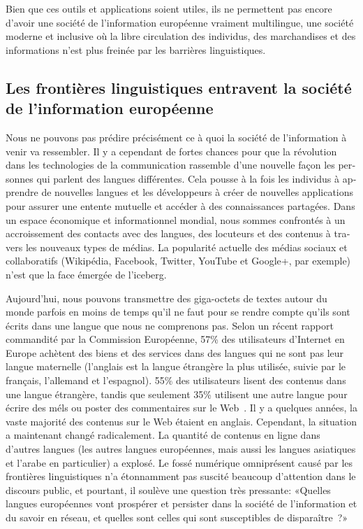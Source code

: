 \begin{french}
\begin{multicols}{2}
Bien que ces outils et applications soient utiles, ils ne permettent
pas encore d'avoir une société de l'information européenne
vraiment multilingue, une société moderne et inclusive où la libre
circulation des individus, des marchandises et des informations n'est
plus freinée par les barrières linguistiques.

\subsection{Les frontières linguistiques entravent la société de l'information européenne}

Nous ne pouvons pas prédire précisément ce à quoi la société de
l'information à venir va ressembler. Il y a cependant de
fortes chances pour que la révolution dans les technologies de la
communication rassemble d'une nouvelle façon les personnes qui
parlent des langues différentes. Cela pousse à la fois les individus à
apprendre de nouvelles langues et les développeurs à créer de
nouvelles applications pour assurer une entente mutuelle et accéder à
des connaissances partagées.
Dans un espace économique et informationnel mondial, nous sommes
confrontés à un accroissement des contacts avec des langues, des
locuteurs et des contenus à travers les nouveaux types de médias. La
popularité actuelle des médias sociaux et collaboratifs (Wikipédia,
Facebook, Twitter, YouTube et Google+, par exemple) n'est que
la face émergée de l'iceberg.

Aujourd'hui, nous pouvons transmettre des giga-octets de textes
autour du monde parfois en moins de temps qu'il ne faut pour se rendre
compte qu'ils sont écrits dans une langue que nous ne comprenons pas.
Selon un récent rapport commandité par la Commission Européenne, 57\%
des utilisateurs d'Internet en Europe achètent des biens et
des services dans des langues qui ne sont pas leur langue maternelle
(l'anglais est la langue étrangère la plus utilisée, suivie
par le français, l'allemand et l'espagnol). 55\% des
utilisateurs lisent des contenus dans une langue étrangère, tandis que
seulement 35\% utilisent une autre langue pour écrire des méls ou
poster des commentaires sur le Web~\cite{Eurobarometer313}. 
Il y a quelques années, la vaste majorité des contenus sur le Web étaient en
anglais. Cependant, la situation a maintenant changé radicalement. La
quantité de contenus en ligne dans d'autres langues (les
autres langues européennes, mais aussi les langues asiatiques et
l'arabe en particulier) a explosé.
Le fossé numérique omniprésent causé par les frontières linguistiques
n'a étonnamment pas suscité beaucoup d'attention dans
le discours public, et pourtant, il soulève une question très
pressante: «Quelles langues européennes vont prospérer et persister
  dans la société de l'information et du savoir en réseau, et
  quelles sont celles qui sont susceptibles de disparaître~?»


\end{multicols}
\end{french}
